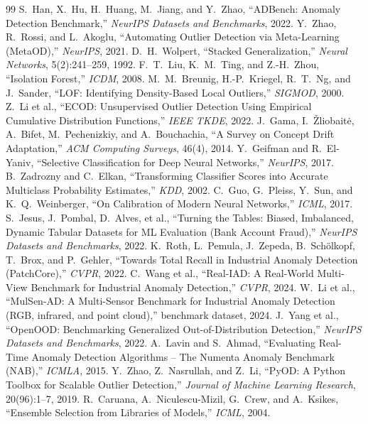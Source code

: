 \documentclass[10pt,conference]{IEEEtran}
\begin{document}
\begin{thebibliography}{99}
 S.~Han, X.~Hu, H.~Huang, M.~Jiang, and Y.~Zhao, ``ADBench: Anomaly Detection Benchmark,'' \emph{NeurIPS Datasets and Benchmarks}, 2022.
 Y.~Zhao, R.~Rossi, and L.~Akoglu, ``Automating Outlier Detection via Meta-Learning (MetaOD),'' \emph{NeurIPS}, 2021.
 D.~H.~Wolpert, ``Stacked Generalization,'' \emph{Neural Networks}, 5(2):241--259, 1992.
 F.~T.~Liu, K.~M.~Ting, and Z.-H.~Zhou, ``Isolation Forest,'' \emph{ICDM}, 2008.
 M.~M.~Breunig, H.-P.~Kriegel, R.~T.~Ng, and J.~Sander, ``LOF: Identifying Density-Based Local Outliers,'' \emph{SIGMOD}, 2000.
 Z.~Li et al., ``ECOD: Unsupervised Outlier Detection Using Empirical Cumulative Distribution Functions,'' \emph{IEEE TKDE}, 2022.
 J.~Gama, I.~\v{Z}liobait\.{e}, A.~Bifet, M.~Pechenizkiy, and A.~Bouchachia, ``A Survey on Concept Drift Adaptation,'' \emph{ACM Computing Surveys}, 46(4), 2014.
 Y.~Geifman and R.~El-Yaniv, ``Selective Classification for Deep Neural Networks,'' \emph{NeurIPS}, 2017.
 B.~Zadrozny and C.~Elkan, ``Transforming Classifier Scores into Accurate Multiclass Probability Estimates,'' \emph{KDD}, 2002.
 C.~Guo, G.~Pleiss, Y.~Sun, and K.~Q.~Weinberger, ``On Calibration of Modern Neural Networks,'' \emph{ICML}, 2017.
 S.~Jesus, J.~Pombal, D.~Alves, et al., ``Turning the Tables: Biased, Imbalanced, Dynamic Tabular Datasets for ML Evaluation (Bank Account Fraud),'' \emph{NeurIPS Datasets and Benchmarks}, 2022.
 K.~Roth, L.~Pemula, J.~Zepeda, B.~Sch\"olkopf, T.~Brox, and P.~Gehler, ``Towards Total Recall in Industrial Anomaly Detection (PatchCore),'' \emph{CVPR}, 2022.
 C.~Wang et al., ``Real-IAD: A Real-World Multi-View Benchmark for Industrial Anomaly Detection,'' \emph{CVPR}, 2024.
 W.~Li et al., ``MulSen-AD: A Multi-Sensor Benchmark for Industrial Anomaly Detection (RGB, infrared, and point cloud),'' benchmark dataset, 2024.
 J.~Yang et al., ``OpenOOD: Benchmarking Generalized Out-of-Distribution Detection,'' \emph{NeurIPS Datasets and Benchmarks}, 2022.
 A.~Lavin and S.~Ahmad, ``Evaluating Real-Time Anomaly Detection Algorithms -- The Numenta Anomaly Benchmark (NAB),'' \emph{ICMLA}, 2015.
 Y.~Zhao, Z.~Nasrullah, and Z.~Li, ``PyOD: A Python Toolbox for Scalable Outlier Detection,'' \emph{Journal of Machine Learning Research}, 20(96):1--7, 2019.
 R.~Caruana, A.~Niculescu-Mizil, G.~Crew, and A.~Ksikes, ``Ensemble Selection from Libraries of Models,'' \emph{ICML}, 2004.

\end{thebibliography}
\end{document}
